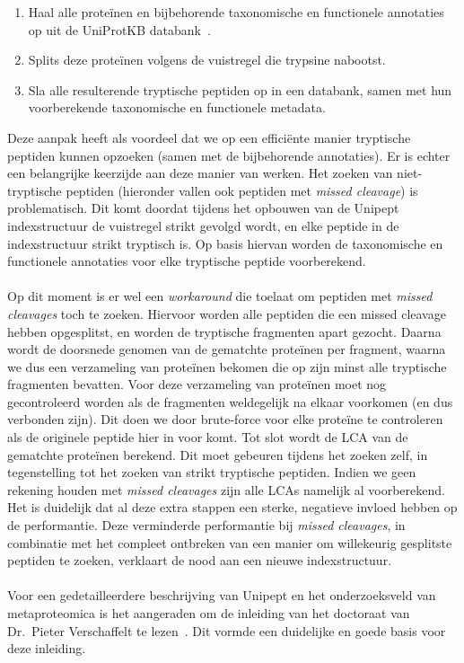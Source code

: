 \begin{enumerate}
    \item Haal alle proteïnen en bijbehorende taxonomische en functionele annotaties op uit de UniProtKB databank~\cite{UniprotKB}.
    \item Splits deze proteïnen volgens de vuistregel die trypsine nabootst.
    \item Sla alle resulterende tryptische peptiden op in een databank, samen met hun voorberekende taxonomische en functionele metadata.
\end{enumerate}

Deze aanpak heeft als voordeel dat we op een efficiënte manier tryptische peptiden kunnen opzoeken (samen met de bijbehorende annotaties).
Er is echter een belangrijke keerzijde aan deze manier van werken.
Het zoeken van niet-tryptische peptiden (hieronder vallen ook peptiden met \textit{missed cleavage}) is problematisch.
Dit komt doordat tijdens het opbouwen van de Unipept indexstructuur de vuistregel strikt gevolgd wordt, en elke peptide in de indexstructuur strikt tryptisch is.
Op basis hiervan worden de taxonomische en functionele annotaties voor elke tryptische peptide voorberekend.
\\ \\
Op dit moment is er wel een \textit{workaround} die toelaat om peptiden met \textit{missed cleavages} toch te zoeken.
Hiervoor worden alle peptiden die een missed cleavage hebben opgesplitst, en worden de tryptische fragmenten apart gezocht.
Daarna wordt de doorsnede genomen van de gematchte proteïnen per fragment, waarna we dus een verzameling van proteïnen bekomen die op zijn minst alle tryptische fragmenten bevatten.
Voor deze verzameling van proteïnen moet nog gecontroleerd worden als de fragmenten weldegelijk na elkaar voorkomen (en dus verbonden zijn).
Dit doen we door brute-force voor elke proteïne te controleren als de originele peptide hier in voor komt.
Tot slot wordt de LCA van de gematchte proteïnen berekend.
Dit moet gebeuren tijdens het zoeken zelf, in tegenstelling tot het zoeken van strikt tryptische peptiden.
Indien we geen rekening houden met \textit{missed cleavages} zijn alle LCAs namelijk al voorberekend.
Het is duidelijk dat al deze extra stappen een sterke, negatieve invloed hebben op de performantie.
Deze verminderde performantie bij \textit{missed cleavages}, in combinatie met het compleet ontbreken van een manier om willekeurig gesplitste peptiden te zoeken, verklaart de nood aan een nieuwe indexstructuur.
\\ \\
Voor een gedetailleerdere beschrijving van Unipept en het onderzoeksveld van metaproteomica is het aangeraden om de inleiding van het doctoraat van Dr.~Pieter Verschaffelt te lezen~\cite{phdPieterUnipept}.
Dit vormde een duidelijke en goede basis voor deze inleiding.


